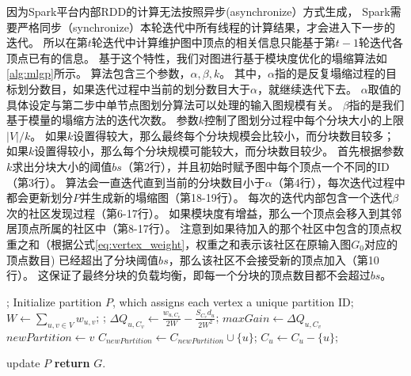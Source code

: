 \documentclass[master]{njuthesis}
\begin{document}
因为Spark平台内部RDD的计算无法按照异步(asynchronize）方式生成，
Spark需要严格同步（synchronize）本轮迭代中所有线程的计算结果，才会进入下一步的迭代。
所以在第$t$轮迭代中计算维护图中顶点的相关信息只能基于第$t-1$轮迭代各顶点已有的信息。
基于这个特性，我们对图进行基于模块度优化的塌缩算法如\ref{alg:mlgp}所示。
算法包含三个参数，$\alpha, \beta, k$。
其中，$\alpha$指的是反复塌缩过程的目标划分数目，如果迭代过程中当前的划分数目大于$\alpha$，就继续迭代下去。
$\alpha$取值的具体设定与第二步中单节点图划分算法可以处理的输入图规模有关。
$\beta$指的是我们基于模量的塌缩方法的迭代次数。
参数$k$控制了图划分过程中每个分块大小的上限$|V|/k$。
如果$k$设置得较大，那么最终每个分块规模会比较小，而分块数目较多；
如果$k$设置得较小，那么每个分块规模可能较大，而分块数目较少。
首先根据参数$k$求出分块大小的阈值$bs$（第2行），并且初始时赋予图中每个顶点一个不同的ID（第3行）。
算法会一直迭代直到当前的分块数目小于$\alpha$（第4行），每次迭代过程中都会更新划分$P$并生成新的塌缩图（第18-19行）。
每次的迭代内部包含一个迭代$\beta$次的社区发现过程（第6-17行）。
如果模块度有增益，那么一个顶点会移入到其邻居顶点所属的社区中（第8-17行）。
注意到如果待加入的那个社区中包含的顶点权重之和（根据公式\ref{eq:vertex_weight}，权重之和表示该社区在原输入图$G_0$对应的顶点数目)
已经超出了分块阈值$bs$，那么该社区不会接受新的顶点加入（第10行）。
这保证了最终分块的负载均衡，即每一个分块的顶点数目都不会超过$bs$。

\begin{algorithm}[h]
\label{alg:mlgp}
\begin{algorithmic}[1]
  ;
  \State Initialize partition $P$, which assigns each vertex a unique partition ID;
       
	  \State $W \gets \sum\nolimits_{u,v \in V} w_{u,v}$; 
		;
		   
		     \State $\Delta Q_{u,C_{v}} \gets \frac{w_{u,C_v}}{2W} - \frac{S_{C_v}d_u}{2W^2}$;
		      \State $maxGain \gets \Delta Q_{u,C_{v}}$
		      \State $newPartition \gets v$
		     \EndIf
		   \EndIf
		\EndFor
		    \State $C_{newPartition} \gets C_{newPartition}\cup\{u\}$;
		    \State $C_{u} \gets C_{u} - \{u\}$;
		    
		\EndIf	
	    \EndFor
	  \EndFor
	  \State update $P$
	\EndWhile
\State \textbf{return} $G$.
\EndProcedure
\end{algorithmic}
\end{algorithm}
\end{document}
